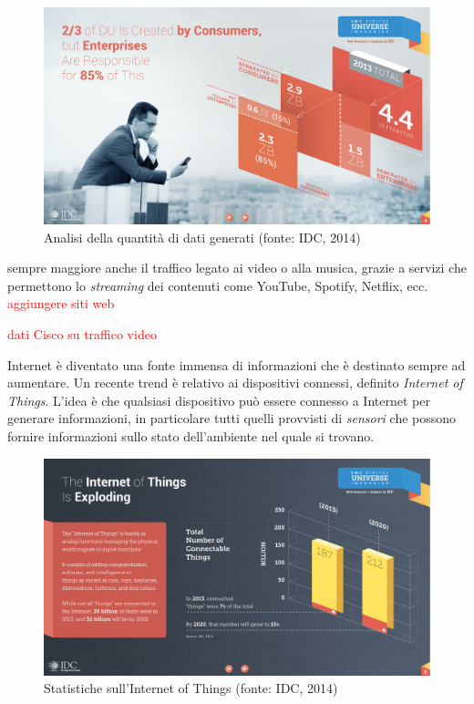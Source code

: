 \begin{figure}[ht]
	\centering
	\includegraphics[width=\textwidth]{1-introduzione/immagini/dati-generati-consumer.pdf}
	\caption[Analisi della quantità di dati generati]{Analisi della quantità di dati generati (fonte: IDC, 2014)\label{fig:analisi-dati-generati}}
\end{figure}

\upe sempre maggiore anche il traffico legato ai video o alla musica, grazie a servizi che permettono lo \emph{streaming} dei contenuti come YouTube, Spotify, Netflix, ecc. \textcolor{red}{aggiungere siti web} 

\textcolor{red}{dati Cisco su traffico video}

Internet è diventato una fonte immensa di informazioni che è destinato sempre ad aumentare. Un recente trend è relativo ai dispositivi connessi, definito \emph{Internet of Things}. L'idea è che qualsiasi dispositivo può essere connesso a Internet per generare informazioni, in particolare tutti quelli provvisti di \emph{sensori} che possono fornire informazioni sullo stato dell'ambiente nel quale si trovano.

\begin{figure}[ht]
	\centering
	\includegraphics[width=\textwidth]{1-introduzione/immagini/iot-trend.pdf}
	\caption[Statistiche sull'Internet of Things]{Statistiche sull'Internet of Things (fonte: IDC, 2014)\label{fig:statistiche-iot}}
\end{figure}

